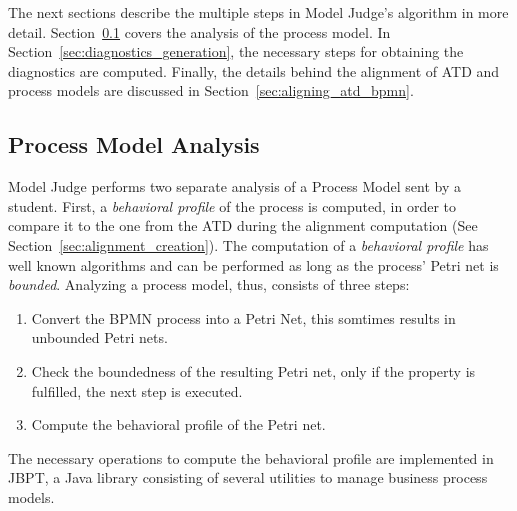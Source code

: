 The next sections describe the multiple steps in Model Judge's algorithm
in more detail. Section~\ref{sec:process_model_analysis} covers the analysis of
the process model. In Section~\ref{sec:diagnostics_generation}, the necessary
steps for obtaining the diagnostics are computed. Finally, the details behind
the alignment of ATD and process models are discussed in
Section~\ref{sec:aligning_atd_bpmn}.

\subsection{Process Model Analysis}
\label{sec:process_model_analysis}

Model Judge performs two separate analysis of a Process Model sent by a
student. First, a \emph{behavioral profile} of the process is computed, in order
to compare it to the one from the ATD during the alignment computation (See
Section~\ref{sec:alignment_creation}). The computation of a \emph{behavioral
  profile} has well known algorithms and can be performed as long as the
process' Petri net is \emph{bounded}\cite[Section IV.B]{murata1989petri}.
Analyzing a process model, thus, consists of three steps:
\begin{enumerate}
  \item Convert the BPMN process into a Petri Net, this somtimes results in
    unbounded Petri nets.
  \item Check the boundedness of the resulting Petri net, only if the
    property is fulfilled, the next step is executed.
  \item Compute the behavioral profile of the Petri net.  
\end{enumerate}

The necessary operations to compute the behavioral profile are implemented in
JBPT\cite{polyvyanyy2013towards}, a Java library consisting of several utilities
to manage business process models.

